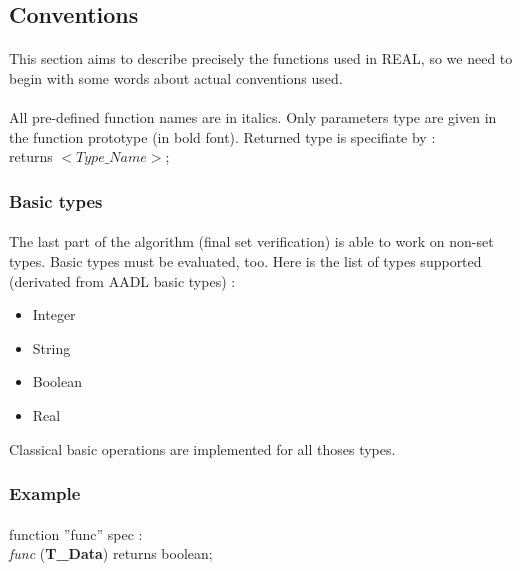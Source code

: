\label {predefined_stuf}

\subsection {Conventions}

\paragraph{}
This section aims to describe precisely the functions used 
in REAL, so we need to begin with some words about actual 
conventions used.

\paragraph{}
All pre-defined function names are in italics. Only parameters 
type are given in the function prototype (in bold font). 
Returned type is specifiate by :\\
returns $<Type\_Name>$;

\subsubsection {Basic types}
\paragraph{}
The last part of the algorithm (final set verification) is
able to work on non-set types. Basic types must be evaluated, 
too. Here is the list of types supported (derivated from AADL 
basic types) :

\begin {itemize}
\item Integer
\item String
\item Boolean
\item Real
\end {itemize}
Classical basic operations are implemented for all thoses types.

\subsubsection{Example}
\paragraph{}
function ''func'' spec :\\ 
\textit{func} (\textbf{T\_Data}) returns boolean; 

